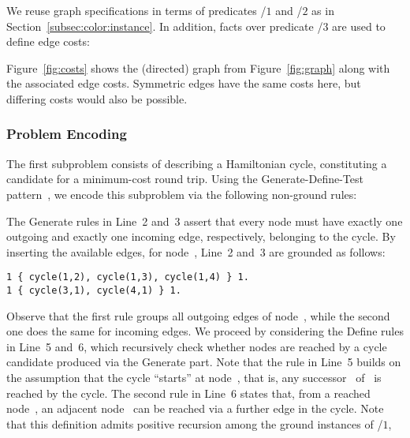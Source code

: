 We reuse graph specifications in terms of predicates /$1$ and /$2$
as in Section~\ref{subsec:color:instance}.
In addition, facts over predicate /$3$ are used to define edge costs:
%

%
Figure~\ref{fig:costs} shows the (directed) graph from Figure~\ref{fig:graph}
along with the associated edge costs.
Symmetric edges have the same costs here,
but differing costs would also be possible.


\subsubsection{Problem Encoding}\label{subsec:tsp:encoding}

The first subproblem consists of describing a Hamiltonian cycle,
constituting a candidate for a minimum-cost round trip.
Using the Generate-Define-Test pattern~\cite{lifschitz02a},
we encode this subproblem via the following non-ground rules:
%

%
The Generate rules in Line~2 and~3 assert that every node must have
exactly one outgoing and exactly one incoming edge, respectively,
belonging to the cycle.
By inserting the available edges, for node~,
Line~2 and~3 are grounded as follows:%
%
\begin{lstlisting}[numbers=none]
1 { cycle(1,2), cycle(1,3), cycle(1,4) } 1.
1 { cycle(3,1), cycle(4,1) } 1.
\end{lstlisting}
%
Observe that the first rule groups all outgoing edges of node~,
while the second one does the same for incoming edges.
We proceed by considering the Define rules in Line~5 and~6,
which recursively check whether nodes are reached by a cycle candidate
produced via the Generate part.
Note that the rule in Line~5 builds on the assumption that the cycle
``starts'' at node~, that is,
any successor~ of~ is reached by the cycle.
The second rule in Line~6 states that, from a reached node~,
an adjacent node~ can be reached via a further edge in the cycle.
Note that this definition admits positive recursion
among the ground instances of /$1$,
